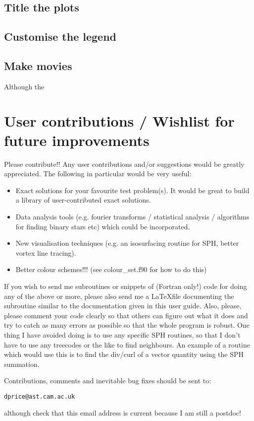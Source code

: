 \documentclass[a4paper,12pt]{article}
\begin{document}
\subsection{Title the plots}

\subsection{Customise the legend}

\subsection{Make movies}
 Although the 

\section{User contributions / Wishlist for future improvements}
 Please contribute!! Any user contributions and/or suggestions would be greatly
appreciated. The following in particular would be very useful:

\begin{itemize}
\item Exact solutions for your favourite test problem(s). It would be great to
build a library of user-contributed exact solutions.
\item Data analysis tools (e.g. fourier transforms / statistical analysis /
algorithms for finding binary stars etc) which could be incorporated.
\item New visualisation techniques (e.g. an isosurfacing routine for SPH, better
vortex line tracing).
\item Better colour schemes!!! (see colour\_set.f90 for how to do this)
\end{itemize}

If you wish to send me subroutines or snippets of (Fortran only!) code for doing any of the above or
more, please also send me a \LaTeX file
documenting the subroutine similar to the documentation given in this user guide.
Also, please, please comment your code clearly so that others can figure out
what it does and try to catch as many errors as possible so that the whole
program is robust.  One thing I have avoided doing is to use any specific SPH routines, so that I
don't have to use any treecodes or the like to find neighbours. An example of a
routine which would use this is to find the div/curl of a vector quantity using
the SPH summation.

Contributions, comments and inevitable bug fixes
should be sent to:
\begin{verbatim}
dprice@ast.cam.ac.uk
\end{verbatim}
although check that this email address is current because I am still a postdoc!
\end{document}
